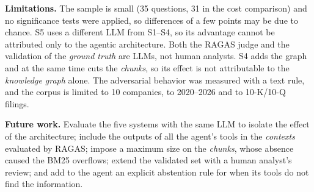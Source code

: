 \documentclass[conference]{IEEEtran}
\begin{document}
\textbf{Limitations.} The sample is small (35 questions, 31 in the cost comparison) and no significance tests were applied, so differences of a few points may be due to chance. S5 uses a different LLM from S1--S4, so its advantage cannot be attributed only to the agentic architecture. Both the RAGAS judge and the validation of the \textit{ground truth} are LLMs, not human analysts. S4 adds the graph and at the same time cuts the \textit{chunks}, so its effect is not attributable to the \textit{knowledge graph} alone. The adversarial behavior was measured with a text rule, and the corpus is limited to 10 companies, to 2020--2026 and to 10-K/10-Q filings.

\textbf{Future work.} Evaluate the five systems with the same LLM to isolate the effect of the architecture; include the outputs of all the agent's tools in the \textit{contexts} evaluated by RAGAS; impose a maximum size on the \textit{chunks}, whose absence caused the BM25 overflows; extend the validated set with a human analyst's review; and add to the agent an explicit abstention rule for when its tools do not find the information.
\end{document}
